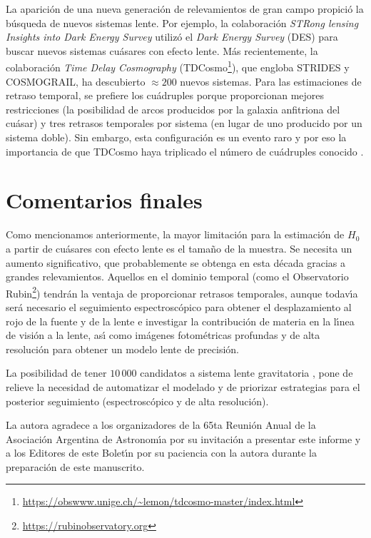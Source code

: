 \documentclass[baaa]{baaa}
\begin{document}
La aparici\'on de una nueva generaci\'on de relevamientos de gran campo propici\'o la b\'usqueda de nuevos sistemas lente. Por ejemplo, la colaboraci\'on {\em STRong lensing Insights into Dark Energy Survey} \cite[STRIDES\footnote{\url{http://strides.astro.ucla.edu}},][]{treu2018} utiliz\'o el {\em Dark Energy Survey} (DES) para buscar nuevos sistemas cu\'asares con efecto lente.  M\'as recientemente, la colaboraci\'on {\em Time Delay Cosmography} (TDCosmo\footnote{\url{https://obswww.unige.ch/~lemon/tdcosmo-master/index.html}}), que engloba STRIDES y COSMOGRAIL, ha descubierto $\approx 200$ nuevos sistemas. 
Para las estimaciones de retraso temporal, se prefiere los cuádruples porque proporcionan mejores restricciones (la posibilidad de arcos producidos por la galaxia anfitriona del cu\'asar) y tres retrasos temporales por sistema (en lugar de uno producido por un sistema doble). Sin embargo, esta configuraci\'on es un evento raro y por eso la importancia de que TDCosmo haya triplicado el n\'umero de cu\'adruples conocido  \citep[agregando 30 sistemas a los 15 conocidos,][]{shajib2019, schmidt2023}. 

\section{Comentarios finales}

Como mencionamos anteriormente, la mayor limitaci\'on para la estimaci\'on de $H_0$ a partir de cu\'asares con efecto lente es el tama\~no de la muestra. Se necesita un aumento significativo, que probablemente se obtenga en esta d\'ecada gracias a grandes relevamientos. Aquellos en el dominio temporal (como el Observatorio Rubin\footnote{\url{https://rubinobservatory.org}}) tendr\'an la ventaja de proporcionar retrasos temporales, aunque todav\'{\i}a ser\'a necesario el seguimiento espectrosc\'opico para obtener el desplazamiento al rojo de la fuente y de la lente e investigar la contribuci\'on de materia en la l\'{\i}nea de visi\'on a la lente, as\'{\i} como im\'agenes fotom\'etricas profundas y de alta resoluci\'on para obtener un modelo lente de precisi\'on. 

La posibilidad de tener $10\,000$ candidatos a sistema lente gravitatoria \citep{treu2010}, pone de relieve la necesidad de automatizar el modelado y de priorizar estrategias para el posterior seguimiento (espectrosc\'opico y de alta resoluci\'on). 





\begin{acknowledgement}
La autora agradece a los organizadores de la 65ta Reuni\'on Anual de la Asociaci\'on Argentina de Astronom\'{\i}a por su invitaci\'on a presentar este informe y a los Editores de este Bolet\'{\i}n por su paciencia con la autora durante la preparaci\'on de este manuscrito.
\end{acknowledgement}
\end{document}
